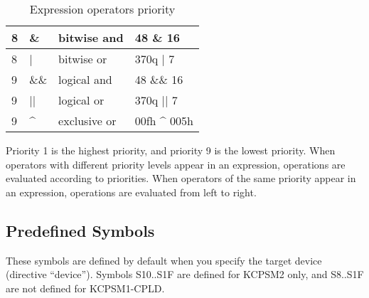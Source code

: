 \begin{table}[h!]
\begin{tabular}{|l|l|l|l|}
                8        & \&       & bitwise and             & 48 \& 16        \\\hline
                8        & |        & bitwise or              & 370q | 7        \\\hline
                9        & \&\&     & logical and             & 48 \&\& 16      \\\hline
                9        & ||       & logical or              & 370q || 7       \\\hline
                9        & \^{}     & exclusive or            & 00fh \^{} 005h  \\\hline
            \end{tabular}

            \caption{Expression operators priority}
        \end{table}

        Priority 1 is the highest priority, and priority 9 is the lowest priority. When operators with different priority levels appear in an expression, operations are evaluated according to priorities. When operators of the same priority appear in an expression, operations are evaluated from left to right.

    \clearpage
    \subsection{Predefined Symbols}
        These symbols are defined by default when you specify the target device (directive ``device''). Symbols S10..S1F are defined for KCPSM2 only, and S8..S1F are not defined for KCPSM1-CPLD.

